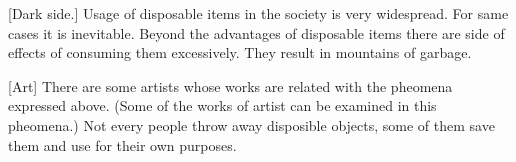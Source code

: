 [Dark side.] Usage of disposable items in the society is very widespread. For same cases it is inevitable. Beyond the advantages of disposable items there are side of effects of consuming them excessively. They result in mountains of garbage.

 





%
%
[Art] There are some artists whose works are related with the pheomena expressed above. (Some of the works of artist can be examined in this pheomena.) Not every people throw away disposible objects, some of them save them and use for their own purposes. 


